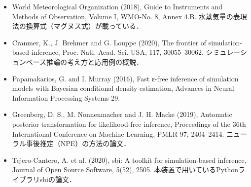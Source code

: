 \documentclass{ltjsarticle}
\begin{document}
\begin{itemize}
κ-ケーラー理論の原論文．
\item World Meteorological Organization (2018), Guide to Instruments and Methods of Observation, Volume I, WMO-No. 8, Annex 4.B.
水蒸気量の表現法の換算式（マグヌス式）が載っている．
\item Cranmer, K., J. Brehmer and G. Louppe (2020), The frontier of simulation-based inference, Proc. Natl. Acad. Sci. USA, 117, 30055--30062.
シミュレーションベース推論の考え方と応用例の概説．
\item Papamakarios, G. and I. Murray (2016), Fast ε-free inference of simulation models with Bayesian conditional density estimation, Advances in Neural Information Processing Systems 29.
\item Greenberg, D. S., M. Nonnenmacher and J. H. Macke (2019), Automatic posterior transformation for likelihood-free inference, Proceedings of the 36th International Conference on Machine Learning, PMLR 97, 2404--2414.
ニューラル事後推定（NPE）の方法の論文．
\item Tejero-Cantero, A. et al. (2020), sbi: A toolkit for simulation-based inference, Journal of Open Source Software, 5(52), 2505.
本装置で用いているPythonライブラリsbiの論文．
\end{itemize}
\end{document}
